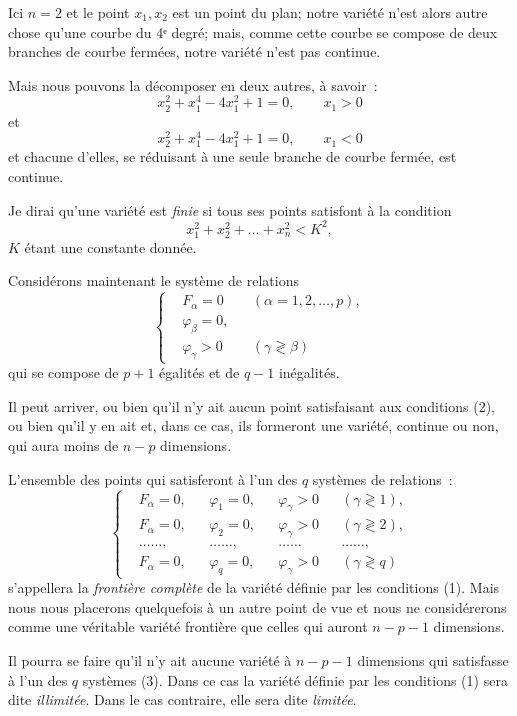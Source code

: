 \documentclass{article}
\begin{document}
Ici $n = 2$ et le point $x_{1}, x_{2}$ est un point du plan; notre variété n'est alors autre chose qu'une courbe du 4ᵉ degré; mais, comme cette courbe se compose de deux branches de courbe fermées, notre variété n'est pas continue.

Mais nous pouvons la décomposer en deux autres, à savoir~:
\[
x^{2}_{2} + x^{4}_{1} - 4x^{2}_{1} + 1 = 0, \qquad x_{1} > 0
\]
et
\[
x^{2}_{2} + x^{4}_{1} - 4x^{2}_{1} + 1 = 0, \qquad x_{1} < 0
\]
et chacune d'elles, se réduisant à une seule branche de courbe fermée, est continue.

Je dirai qu'une variété est \emph{finie} si tous ses points satisfont à la condition
\[
x^{2}_{1} + x^{2}_{2} + \ldots + x^{2}_{n} < K^{2},
\]
$K$ étant une constante donnée.

Considérons maintenant le système de relations
\[
\left\{
\begin{aligned}
&F_{\alpha} = 0 &&(\alpha = 1, 2, \ldots, p),\\
&\varphi_{\beta} = 0,\\
&\varphi_{\gamma} > 0 &&(\gamma \gtrless \beta)
\end{aligned}
\right.
\tag{2}
\]
qui se compose de $p + 1$ égalités et de $q - 1$ inégalités.

Il peut arriver, ou bien qu'il n'y ait aucun point satisfaisant aux conditions (2), ou bien qu'il y en ait et, dans ce cas, ils formeront une variété, continue ou non, qui aura moins de $n - p$ dimensions.

L'ensemble des points qui satisferont à l'un des $q$ systèmes de relations~:
\[
\left\{
\begin{aligned}
&F_{\alpha} = 0, &&\varphi_{1} = 0, &&\varphi_{\gamma} > 0 &&(\gamma \gtrless 1),\\
&F_{\alpha} = 0, &&\varphi_{2} = 0, &&\varphi_{\gamma} > 0 &&(\gamma \gtrless 2),\\
&\ldots\ldots, &&\ldots\ldots, &&\ldots\ldots &&\ldots\ldots,\\
&F_{\alpha} = 0, &&\varphi_{q} = 0, &&\varphi_{\gamma} > 0 &&(\gamma \gtrless q)
\end{aligned}
\right.
\tag{3}
\]
s'appellera la \emph{frontière complète} de la variété définie par les conditions (1). Mais nous nous placerons quelquefois à un autre point de vue et nous ne considérerons comme une véritable variété frontière que celles qui auront $n - p - 1$ dimensions.

Il pourra se faire qu'il n'y ait aucune variété à $n - p - 1$ dimensions qui satisfasse à l'un des $q$ systèmes (3). Dans ce cas la variété définie par les conditions (1) sera dite \emph{illimitée}. Dans le cas contraire, elle sera dite \emph{limitée}.
\end{document}
